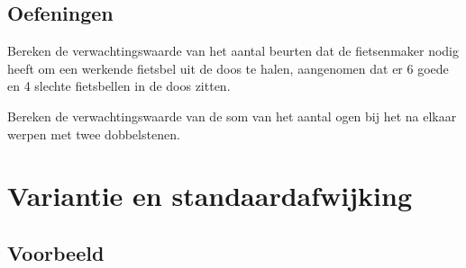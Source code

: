 \documentclass[a4paper,12pt, twoside]{article}
\begin{document}
\subsection{Oefeningen}

\begin{oefening}
Bereken de verwachtingswaarde van het aantal beurten dat de fietsenmaker nodig heeft om een werkende fietsbel uit de doos te halen, aangenomen dat er 6 goede en 4 slechte fietsbellen in de doos zitten.
\end{oefening}

\begin{oefening}
Bereken de verwachtingswaarde van de som van het aantal ogen bij het na elkaar werpen met twee dobbelstenen.
\end{oefening}

\pagebreak

\section{Variantie en standaardafwijking}

\subsection{Voorbeeld}
\end{document}
